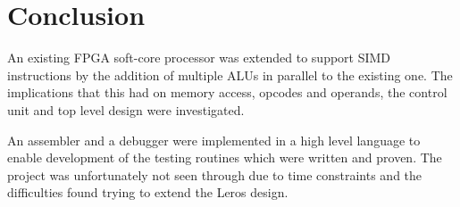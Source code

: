 \section{Conclusion}
An existing FPGA soft-core processor was extended to support SIMD instructions
by the addition of multiple ALUs in parallel to the existing one. The implications that 
this had on memory access, opcodes and operands, the control unit and top level 
design were investigated. 

An assembler and a debugger were implemented in a high level language to enable 
development of the testing routines which were written and proven. The project was 
unfortunately not seen through due to time constraints and the difficulties found 
trying to extend the Leros design.